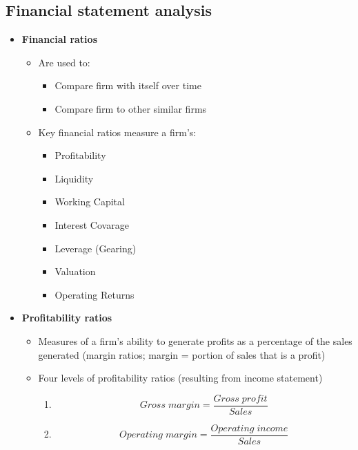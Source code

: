\documentclass[ieeetran]{article}
\begin{document}
\subsection{Financial statement analysis} %
\label{ssub:}
\begin{itemize}
  \item \textbf{Financial ratios}
	  \begin{itemize}
	    \item Are used to:
		    \begin{itemize}
		      \item Compare firm with itself over time
		      \item Compare firm to other similar firms
		    \end{itemize}
	    \item Key financial ratios measure a firm's:
		    \begin{itemize}
		      \item Profitability
		      \item Liquidity
		      \item Working Capital
		      \item Interest Covarage
		      \item Leverage (Gearing)
		      \item Valuation
		      \item Operating Returns 
		    \end{itemize}
	  \end{itemize}

 \item \textbf{Profitability ratios}
	 \begin{itemize}
		 \item Measures of a firm's ability to generate profits as a percentage of the sales generated (margin ratios; margin = portion of sales that is a profit)
		\item Four levels of profitability ratios (resulting from income statement)
			\begin{enumerate}
			  \item 
			  \large
			  \begin{equation*}
			  \boxed{Gross \; margin = \frac{Gross \; profit}{Sales}}
			  \end{equation*}
			  \normalsize
			  
			  \item 
			  \large
			  \begin{equation*}
			  \boxed{Operating \; margin = \frac{Operating \; income}{Sales}}
			  \end{equation*}
			  \normalsize


\end{enumerate}
\end{itemize}
\end{itemize}
\end{document}
